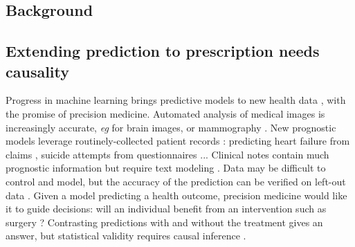 \documentclass[10pt]{article}
\begin{document}
\begin{multicols}{2}

    \section{Background}\label{sec:intro}

    \subsection{Extending prediction to prescription needs causality}

    Progress in machine learning brings predictive models to new health
    data \cite{beam2018big,rajkomar2019machine}, with the promise of
    precision medicine.
    Automated analysis of
    medical images is increasingly accurate, \emph{eg} for brain images,
    \cite{khojaste2022deep,zhang2019radiological} or mammography
    \cite{yala2019deep,shen2019deep,nassif2022breast}.
    New prognostic models leverage routinely-collected
    patient records
    \cite{mooney2018bigdata}: predicting heart
    failure from claims \cite{desai2020comparison}, suicide attempts
    from questionnaires \cite{simon2018predicting}...
    Clinical notes contain much prognostic information
    but require text modeling  \cite{horng2017creating,wang2020prediction,spasic2020clinical}.
    Data may be difficult to
    control and model, but the accuracy of the prediction can be verified
    on left-out data
    \cite{altman2009prognosis,poldrack2020establishment,varoquaux2022evaluating}.
    Given a model predicting a health outcome, precision medicine
    would like it to guide decisions: will an individual benefit from an
    intervention such as surgery \cite{fontana2019can}?
    Contrasting predictions with and without the treatment gives an answer,
    but statistical validity requires causal inference
    \cite{snowden_implementation_2011,blakely2020reflection}.



\end{multicols}
\end{document}

